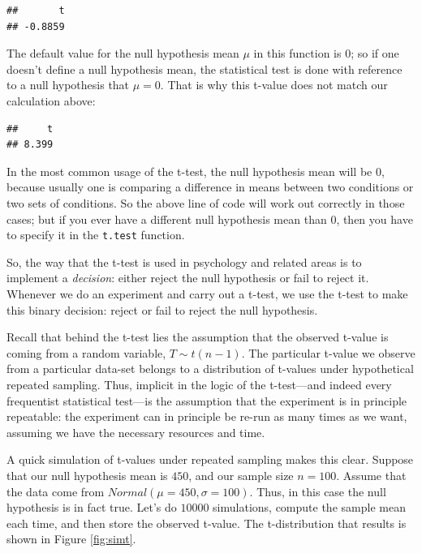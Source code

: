 \documentclass[
  12pt,
]{krantz}
\newenvironment{Shaded}{\begin{snugshade}}{\end{snugshade}}
\newcommand{\FunctionTok}[1]{\textcolor[rgb]{0.00,0.00,0.00}{#1}}
\newcommand{\NormalTok}[1]{#1}
\newcommand{\SpecialCharTok}[1]{\textcolor[rgb]{0.00,0.00,0.00}{#1}}
\theoremstyle{definition}
\theoremstyle{definition}
\theoremstyle{definition}
\theoremstyle{definition}
\theoremstyle{remark}
\begin{document}
\begin{verbatim}
##       t 
## -0.8859
\end{verbatim}

The default value for the null hypothesis mean \(\mu\) in this function is 0; so if one doesn't define a null hypothesis mean, the statistical test is done with reference to a null hypothesis that \(\mu=0\). That is why this t-value does not match our calculation above:

\begin{Shaded}
\end{Shaded}

\begin{verbatim}
##     t 
## 8.399
\end{verbatim}

In the most common usage of the t-test, the null hypothesis mean will be \(0\), because usually one is comparing a difference in means between two conditions or two sets of conditions. So the above line of code will work out correctly in those cases; but if you ever have a different null hypothesis mean than \(0\), then you have to specify it in the \texttt{t.test} function.

So, the way that the t-test is used in psychology and related areas is to implement a \emph{decision}: either reject the null hypothesis or fail to reject it. Whenever we do an experiment and carry out a t-test, we use the t-test to make this binary decision: reject or fail to reject the null hypothesis.

Recall that behind the t-test lies the assumption that the observed t-value is coming from a random variable, \(T\sim t(n-1)\). The particular t-value we observe from a particular data-set belongs to a distribution of t-values under hypothetical repeated sampling. Thus, implicit in the logic of the t-test---and indeed every frequentist statistical test---is the assumption that the experiment is in principle repeatable: the experiment can in principle be re-run as many times as we want, assuming we have the necessary resources and time.

A quick simulation of t-values under repeated sampling makes this clear. Suppose that our null hypothesis mean is \(450\), and our sample size \(n=100\). Assume that the data come from \(Normal(\mu=450,\sigma=100)\). Thus, in this case the null hypothesis is in fact true. Let's do \(10000\) simulations, compute the sample mean each time, and then store the observed t-value. The t-distribution that results is shown in Figure \ref{fig:simt}.
\end{document}
